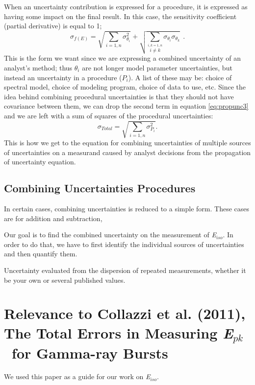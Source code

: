 \documentclass[11pt, oneside]{article}   	%
\newcommand{\eiso}{\textit{E$_{iso}$}}
\newcommand{\epeak}{\textit{E$_{pk}$}}
\begin{document}
When an uncertainty contribution is expressed for a procedure, it is expressed as having some impact on the final result. In this case, the sensitivity coefficient (partial derivative) is equal to 1;
\begin{equation}\label{eq:propunc3}
\sigma_{f(E)} = \sqrt{\sum_{i=1,n} \sigma_{\theta_i}^2}  + \sqrt{\sum_{\stackrel{i,k=1,n}{i \neq k}} \sigma_{\theta_i} \sigma_{\theta_k} } \ \ .
\end{equation}
This is the form we want since we are expressing a combined uncertainty of an analyst's method; thus $\theta_i$ are not longer model parameter uncertainties, but instead an uncertainty in a procedure ($P_i$). A list of these may be: choice of spectral model, choice of modeling program, choice of data to use, etc. Since the idea behind combining procedural uncertainties is that they should not have covariance between them, we can drop the second term in equation \ref{eq:propunc3} and we are left with a sum of squares of the procedural uncertainties:
\begin{equation}\label{eq:propunc4}
\sigma_{Total} = \sqrt{\sum_{i=1,n} \sigma_{P_i}^2}   .
\end{equation}
This is how we get to the equation for combining uncertainties of multiple sources of uncertainties on a measurand caused by analyst decisions from the propagation of uncertainty equation. 



\subsection{Combining Uncertainties Procedures}
In certain cases, combining uncertainties is reduced to a simple form. These cases are for addition and subtraction, 


\clearpage

Our goal is to find the combined uncertainty on the measurement of \eiso. In order to do that, we have to first identify the individual sources of uncertainties and then quantify them. 

Uncertainty evaluated from the dispersion of repeated measurements, whether it be your own or several published values. 

\clearpage




\section{Relevance to Collazzi et al. (2011), The Total Errors in Measuring \epeak \ for Gamma-ray Bursts}
We used this paper as a guide for our work on \eiso. 
\end{document}
